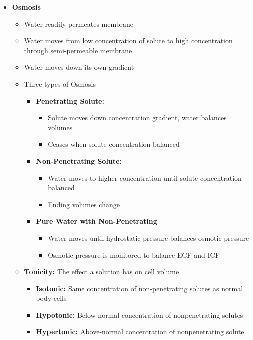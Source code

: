 \documentclass[11pt]{article}
\begin{document}
\begin{itemize}
\item \textbf{Osmosis}
\begin{itemize}
\item Water readily permeates membrane
\item Water moves from low concentration of solute to high concentration through semi-permeable membrane
\item Water moves down its own gradient
\item Three types of Osmosis
\begin{itemize}
\item \textbf{ Penetrating Solute:}
\begin{itemize}
\item Solute moves down concentration gradient, water balances volumes
\item Ceases when solute concentration balanced
\end{itemize}
\item \textbf{Non-Penetrating Solute:}
\begin{itemize}
\item Water moves to higher concentration until solute concentration balanced
\item Ending volumes change
\end{itemize}
\item \textbf{Pure Water with Non-Penetrating}
\begin{itemize}
\item Water moves until hydrostatic pressure balances osmotic pressure
\item Osmotic pressure is monitored to balance ECF and ICF
\end{itemize}
\end{itemize}
\item \textbf{Tonicity:} The effect a solution has on cell volume
\begin{itemize}
\item \textbf{Isotonic:} Same concentration of non-penetrating solutes as normal body cells
\item \textbf{Hypotonic:} Below-normal concentration of nonpenetrating solutes
\item \textbf{Hypertonic:} Above-normal concentration of nonpenetrating solute
\end{itemize}
\end{itemize}

\end{itemize}
\end{document}
